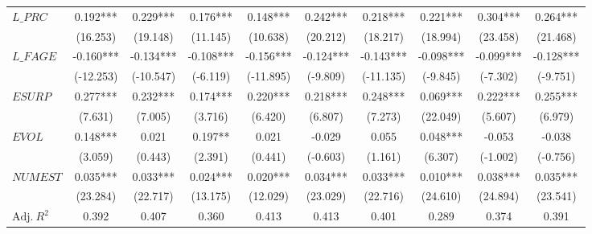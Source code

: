 \documentclass[
  12pt,
  a4paper,
  twoside,
  onecolumn]{article}
\begin{document}
\begin{landscape}
\begin{spacing}{1.0}
\begin{xltabular}{\linewidth}{X * {9}{S[table-format=5.3]}}
\addlinespace
$L\_PRC$ & 0.192*** & 0.229*** & 0.176*** & 0.148*** & 0.242*** & 0.218*** & 0.221*** & 0.304*** & 0.264***\\
 & (16.253) & (19.148) & (11.145) & (10.638) & (20.212) & (18.217) & (18.994) & (23.458) & (21.468)\\
\addlinespace
$L\_FAGE$ & -0.160*** & -0.134*** & -0.108*** & -0.156*** & -0.124*** & -0.143*** & -0.098*** & -0.099*** & -0.128***\\
 & (-12.253) & (-10.547) & (-6.119) & (-11.895) & (-9.809) & (-11.135) & (-9.845) & (-7.302) & (-9.751)\\
\addlinespace
$ESURP$ & 0.277*** & 0.232*** & 0.174*** & 0.220*** & 0.218*** & 0.248*** & 0.069*** & 0.222*** & 0.255***\\
 & (7.631) & (7.005) & (3.716) & (6.420) & (6.807) & (7.273) & (22.049) & (5.607) & (6.979)\\
\addlinespace
$EVOL$ & 0.148*** & 0.021 & 0.197** & 0.021 & -0.029 & 0.055 & 0.048*** & -0.053 & -0.038\\
 & (3.059) & (0.443) & (2.391) & (0.441) & (-0.603) & (1.161) & (6.307) & (-1.002) & (-0.756)\\
\addlinespace
$NUMEST$ & 0.035*** & 0.033*** & 0.024*** & 0.020*** & 0.034*** & 0.033*** & 0.010*** & 0.038*** & 0.035***\\
 & (23.284) & (22.717) & (13.175) & (12.029) & (23.029) & (22.716) & (24.610) & (24.894) & (23.541)\\
\midrule
$\textrm{Adj.} \: R^2$ & 0.392 & 0.407 & 0.360 & 0.413 & 0.413 & 0.401 & 0.289 & 0.374 & 0.391\\*
\end{xltabular}
\end{spacing}
\endgroup{}
\end{landscape}
 \clearpage
\end{document}
